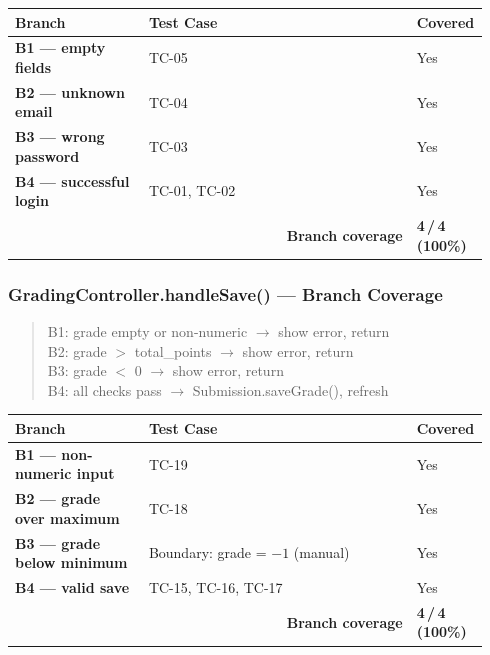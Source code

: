 \documentclass[12pt, a4paper]{article}
\newcommand{\fcolplain}[1]{\textbf{#1}}
\begin{document}
\begin{center}
\begin{tabular}{@{}p{0.28\linewidth}p{0.56\linewidth}p{0.10\linewidth}@{}}
  \toprule
  \fcolplain{Branch} & Test Case & Covered \\
  \midrule
  \fcolplain{B1 --- empty fields} & TC-05                  & Yes \\
\fcolplain{B2 --- unknown email} & TC-04                  & Yes \\
  \fcolplain{B3 --- wrong password} & TC-03                  & Yes \\
\fcolplain{B4 --- successful login} & TC-01, TC-02           & Yes \\
  \midrule
  \multicolumn{2}{r}{\textbf{Branch coverage}} & \textbf{4\,/\,4 (100\%)} \\
  \bottomrule
\end{tabular}
\end{center}

\subsubsection*{GradingController.handleSave() --- Branch Coverage}
\begin{quote}\small\ttfamily
B1: grade empty or non-numeric \hfill $\to$ show error, return\\
B2: grade $>$ total\_points \hfill $\to$ show error, return\\
B3: grade $<$ 0 \hfill $\to$ show error, return\\
B4: all checks pass \hfill $\to$ Submission.saveGrade(), refresh
\end{quote}

\begin{center}
\begin{tabular}{@{}p{0.28\linewidth}p{0.56\linewidth}p{0.10\linewidth}@{}}
  \toprule
  \fcolplain{Branch} & Test Case & Covered \\
  \midrule
  \fcolplain{B1 --- non-numeric input} & TC-19                        & Yes \\
\fcolplain{B2 --- grade over maximum} & TC-18                        & Yes \\
  \fcolplain{B3 --- grade below minimum} & Boundary: grade = $-1$ (manual) & Yes \\
\fcolplain{B4 --- valid save} & TC-15, TC-16, TC-17          & Yes \\
  \midrule
  \multicolumn{2}{r}{\textbf{Branch coverage}} & \textbf{4\,/\,4 (100\%)} \\
  \bottomrule
\end{tabular}
\end{center}
\end{document}
